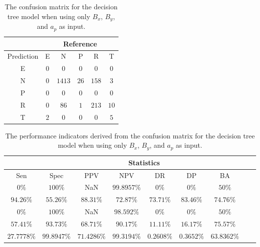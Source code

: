 \begin{table}[!ht]
	\centering
	\begin{tabular}{|c|c|c|c|c|c|}
		\hline
		 & \multicolumn{5}{|c|}{Reference} \\ \hline
		 Prediction & E & N & P & R & T \\ \hline
		 E & $0$ & $0$ & $0$ & $0$ & $0$ \\ \hline
		 N & $0$ & $1413$ & $26$ & $158$ & $3$ \\ \hline
		 P & $0$ & $0$ & $0$ & $0$ & $0$ \\ \hline
		 R & $0$ & $86$ & $1$ & $213$ & $10$ \\ \hline
		 T & $2$ & $0$ & $0$ & $0$ & $5$ \\ \hline
	\end{tabular}
	\caption{The confusion matrix for the decision tree model when using only $B_{x}$, $B_{y}$, and $a_{p}$ as input.}
	\label{tab:cm:xyap:C5.0}
\end{table}

\begin{table}[!ht]
	\centering
	\begin{tabular}{|c|c|c|c|c|c|c|c|c|}
		\hline
		 & \multicolumn{7}{c|}{Statistics} \\ \hline
		Sen & Spec & PPV & NPV & DR & DP & BA \\ \hline
		$0\%$ & $100\%$ & NaN & $99.8957\%$ & $0\%$ & $0\%$ & $50\%$ \\ \hline
		$94.26\%$ & $55.26\%$ & $88.31\%$ & $72.87\%$ & $73.71\%$ & $83.46\%$ & $74.76\%$ \\ \hline
		$0\%$ & $100\%$ & NaN & $98.592\%$ & $0\%$ & $0\%$ & $50\%$ \\ \hline
		$57.41\%$ & $93.73\%$ & $68.71\%$ & $90.17\%$ & $11.11\%$ & $16.17\%$ & $75.57\%$ \\ \hline
		$27.7778\%$ & $99.8947\%$ & $71.4286\%$ & $99.3194\%$ & $0.2608\%$ & $0.3652\%$ & $63.8362\%$ \\ \hline
	\end{tabular}
	\caption{The performance indicators derived from the confusion matrix for the decision tree model when using only $B_{x}$, $B_{y}$, and $a_{p}$ as input.}
	\label{tab:cs:xyap:C5.0}
\end{table}
